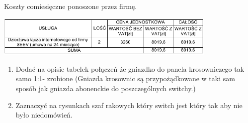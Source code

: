 \documentclass{report}
\begin{document}
\begin{table}[H]
\caption{Koszty comiesięczne ponoszone przez firmę.}
\label{table:koszty_loncze}
 \centering
      \includegraphics[width=0.8\textwidth]{./obrazki/koszty/koszty_loncze.png}
\end{table}




\begin{enumerate}
 \item Dodać na opisie tabelek połączeń że gniazdko do panela krosowniczego tak samo 1:1- zrobione (Gniazda krosownic są przypożądkowane w taki sam sposób jak gniazda abonenckie do poszczególnych switchy.)
\item Zaznaczyć na rysunkach szaf rakowych który switch jest który tak aby nie było niedomówień.
\end{enumerate}

 
\end{document}
